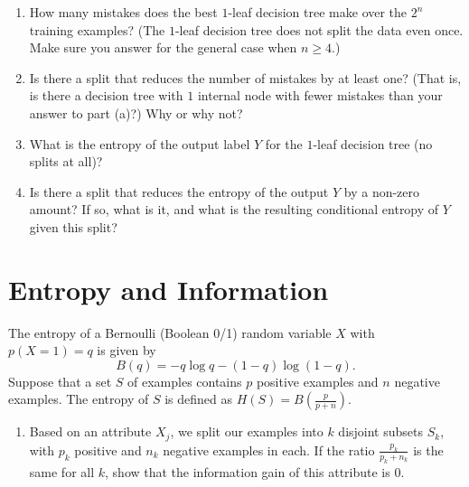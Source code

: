 \documentclass[11pt]{article}
\begin{document}
\begin{enumerate}
\item {} How many mistakes does the best $1$-leaf decision tree make over the $2^n$ training examples? (The $1$-leaf decision tree does not split the data even once. Make sure you answer for the general case when $n \geq 4$.)

\solution{}

\item {} Is there a split that reduces the number of mistakes by at least one? (That is, is there a decision tree with $1$ internal node with fewer mistakes than your answer to part (a)?) Why or why not?

\solution{}

\item {} What is the entropy of the output label $Y$ for the $1$-leaf decision tree (no splits at all)?

\solution{}

\item {} Is there a split that reduces the entropy of the output $Y$ by a non-zero amount? If so, what is it, and what is the resulting conditional entropy of $Y$ given this split?

\solution{}

\end{enumerate}

\ifsoln 
\else
\clearpage
\fi

\section{Entropy and Information }
The entropy of a Bernoulli (Boolean 0/1) random variable $X$ with $p(X = 1) = q$ is given by
\begin{equation*}
B(q) = - q \log q - (1 - q) \log(1 - q).
\end{equation*}
Suppose that a set $S$ of examples contains $p$ positive examples and $n$ negative examples. The entropy of $S$ is defined as $H(S) = B\left(\frac{p}{p+n}\right)$.
\begin{enumerate}
\item {} Based on an attribute $X_j$, we split our examples into $k$ disjoint subsets $S_k$, with $p_k$ positive and $n_k$ negative examples in each. If the ratio $\tfrac{p_k}{p_k + n_k}$ is the same for all $k$, show that the information gain of this attribute is 0.

\solution{}
\end{enumerate}
\end{document}
